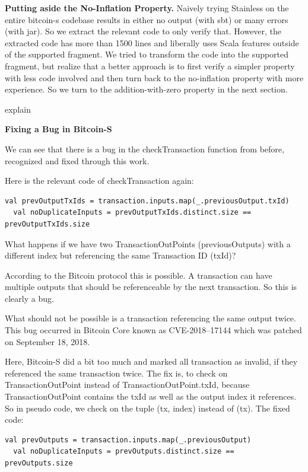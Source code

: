 \documentclass[runningheads]{llncs}
\renewcommand{\paragraph}{\textbf}%
\newcommand{\todo}[1]{{\par \color{red}#1}}
\begin{document}
\paragraph{Putting aside the No-Inflation Property.} Naively trying
Stainless on the entire bitcoin-s codebase results in either no output
(with sbt) or many errors (with jar). So we extract the relevant code
to only verify that. However, the extracted code has more than 1500
lines and liberally uses Scala features outside of the supported
fragment.  We tried to transform the code into the supported fragment,
but realize that a better approach is to first verify a simpler
property with less code involved and then turn back to the
no-inflation property with more experience. So we turn to the
addition-with-zero property in the next section. \todo{explain}


\paragraph{Fixing a Bug in Bitcoin-S}

We can see that there is a bug in the checkTransaction function from
before, recognized and fixed through this work.

Here is the relevant code of checkTransaction again:
\begin{lstlisting}[style=scala]
  val prevOutputTxIds = transaction.inputs.map(_.previousOutput.txId)
  val noDuplicateInputs = prevOutputTxIds.distinct.size == prevOutputTxIds.size
\end{lstlisting}

What happens if we have two TransactionOutPoints (previousOutputs) with a different index but referencing the same Transaction ID (txId)?

According to the Bitcoin protocol this is possible.  A transaction can
have multiple outputs that should be referenceable by the next
transaction.  So this is clearly a bug.

What should not be possible is a transaction referencing the same
output twice.  This bug occurred in Bitcoin Core known as
CVE-2018–17144 which was patched on September 18,
2018. \cite{cve201817144}

Here, Bitcoin-S did a bit too much and marked all transaction as
invalid, if they referenced the same transaction twice.  The fix is,
to check on TransactionOutPoint instead of TransactionOutPoint.txId,
because TransactionOutPoint contains the txId as well as the output
index it references.  So in pseudo code, we check on the tuple (tx,
index) instead of (tx).  The fixed code:
\begin{lstlisting}[style=scala]
  val prevOutputs = transaction.inputs.map(_.previousOutput)
  val noDuplicateInputs = prevOutputs.distinct.size == prevOutputs.size
\end{lstlisting}
\end{document}

